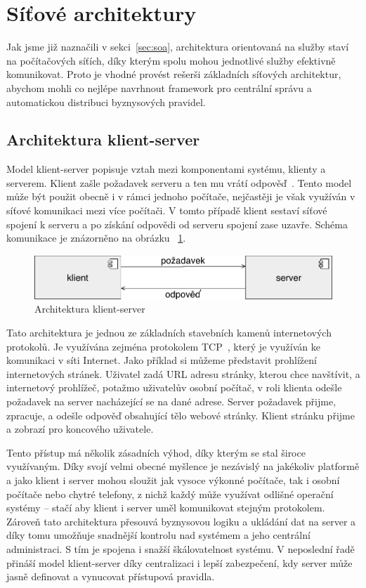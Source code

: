 \section{Síťové architektury}

Jak jsme již naznačili v sekci~\ref{sec:soa}, architektura orientovaná na služby staví
na počítačových síťích, díky kterým spolu mohou jednotlivé služby efektivně komunikovat.
Proto je vhodné provést rešerši základních síťových architektur,
abychom mohli co nejlépe navrhnout framework pro centrální správu
a automatickou distribuci byznysových pravidel.

\subsection{Architektura klient-server}\label{sec:client-server}

Model klient-server popisuje vztah mezi komponentami systému, klienty a serverem.
Klient zašle požadavek serveru a ten mu vrátí odpověď~\cite{berson1992client}.
Tento model může být použit obecně i v rámci jednoho počítače,
nejčastěji je však využíván v síťové komunikaci mezi více počítači.
V tomto případě klient sestaví síťové spojení k serveru a po získání odpovědi
od serveru spojení zase uzavře. Schéma komunikace je znázorněno
na obrázku ~\ref{fig:client-server}.

\begin{figure}[t]
    \centering
    \includegraphics[keepaspectratio=true, width=0.6\linewidth]{figures/client-server.pdf}
    \caption{Architektura klient-server}
    \label{fig:client-server}
\end{figure}

Tato architektura je jednou ze základních stavebních kamenů
internetových protokolů. Je využívána zejména protokolem
\gls{TCP}~\cite{postel1981transmission}, který je využíván ke
komunikaci v síti Internet. Jako příklad si můžeme představit
prohlížení internetových stránek. Uživatel zadá \gls{URL} adresu
stránky, kterou chce navštívit, a internetový prohlížeč, potažmo uživatelův osobní počítač,
v roli klienta odešle požadavek na server nacházející se na dané adrese.
Server požadavek přijme, zpracuje, a odešle odpověď obsahující
tělo webové stránky. Klient stránku přijme a zobrazí pro koncového
uživatele.

Tento přístup má několik zásadních výhod, díky kterým se stal
široce využívaným. Díky svojí velmi obecné myšlence je nezávislý
na jakékoliv platformě a jako klient i server mohou sloužit
jak vysoce výkonné počítače, tak i osobní počítače nebo chytré telefony,
z nichž každý může využívat odlišné operační systémy –
stačí aby klient i server uměl komunikovat stejným protokolem.
Zároveň tato architektura přesouvá byznysovou logiku a
ukládání dat na server a díky tomu umožňuje
snadnější kontrolu nad systémem a jeho centrální administraci. S tím
je spojena i snažší škálovatelnost systému. V neposlední řadě
přináší model klient-server díky centralizaci i lepší zabezpečení,
kdy server může jasně definovat a vynucovat přístupová pravidla.

